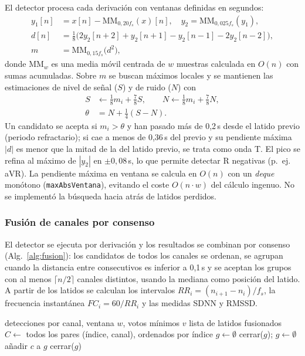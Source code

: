 El detector procesa cada derivación con ventanas definidas en segundos:
\begin{align}
y_1[n]&=x[n]-\mathrm{MM}_{0{,}20 f_s}(x)[n],\quad y_2=\mathrm{MM}_{0{,}025 f_s}(y_1),\\
d[n]&=\tfrac{1}{8}\bigl(2y_2[n{+}2]+y_2[n{+}1]-y_2[n{-}1]-2y_2[n{-}2]\bigr),\\
m&=\mathrm{MM}_{0{,}15 f_s}\!\bigl(d^{2}\bigr),
\end{align}
donde $\mathrm{MM}_w$ es una media móvil centrada de $w$ muestras calculada en $O(n)$ con sumas acumuladas. Sobre $m$ se buscan máximos locales y se mantienen las estimaciones de nivel de señal ($S$) y de ruido ($N$) con
\begin{align}
S&\leftarrow \tfrac18 m_i+\tfrac78 S,\qquad N\leftarrow \tfrac18 m_i+\tfrac78 N,\\
\theta&=N+\tfrac14(S-N).
\end{align}
Un candidato se acepta si $m_i>\theta$ y han pasado más de 0,2\,s desde el latido previo (periodo refractario); si cae a menos de 0,36\,s del previo y su pendiente máxima $|d|$ es menor que la mitad de la del latido previo, se trata como onda T. El pico se refina al máximo de $|y_2|$ en $\pm 0{,}08$\,s, lo que permite detectar R negativas (p.~ej. aVR). La pendiente máxima en ventana se calcula en $O(n)$ con un \emph{deque} monótono (\texttt{maxAbsVentana}), evitando el coste $O(n\cdot w)$ del cálculo ingenuo. No se implementó la búsqueda hacia atrás de latidos perdidos.

\subsubsection{Fusión de canales por consenso}

El detector se ejecuta por derivación y los resultados se combinan por consenso (Alg.~\ref{alg:fusion}): los candidatos de todos los canales se ordenan, se agrupan cuando la distancia entre consecutivos es inferior a 0,1\,s y se aceptan los grupos con al menos $\lceil n/2\rceil$ canales distintos, usando la mediana como posición del latido. A partir de los latidos se calculan los intervalos $RR_i=(n_{i+1}-n_i)/f_s$, la frecuencia instantánea $FC_i=60/RR_i$ y las medidas SDNN y RMSSD.

\begin{algorithm}[t]
\small
\caption{Fusión de detecciones por consenso}
\label{alg:fusion}
\begin{algorithmic}[1]
\Require detecciones por canal, ventana $w$, votos mínimos $v$
\Ensure lista de latidos fusionados
\State $C\leftarrow$ todos los pares (índice, canal), ordenados por índice
\State $g\leftarrow\emptyset$
    \State cerrar($g$); $g\leftarrow\emptyset$
  \EndIf
  \State añadir $c$ a $g$
\EndFor
\State cerrar($g$) 
\end{algorithmic}
\end{algorithm}

